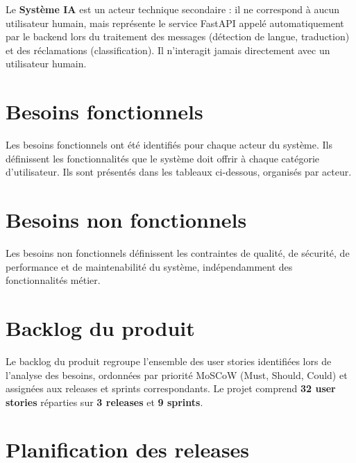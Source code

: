 

Le \textbf{Système IA} est un acteur technique secondaire : il ne correspond à aucun utilisateur humain, mais représente le service FastAPI appelé automatiquement par le backend lors du traitement des messages (détection de langue, traduction) et des réclamations (classification). Il n'interagit jamais directement avec un utilisateur humain.

\section{Besoins fonctionnels}
\label{sec:besoins_fonctionnels}

Les besoins fonctionnels ont été identifiés pour chaque acteur du système. Ils définissent les fonctionnalités que le système doit offrir à chaque catégorie d'utilisateur. Ils sont présentés dans les tableaux ci-dessous, organisés par acteur.



\section{Besoins non fonctionnels}
\label{sec:besoins_non_fonctionnels}

Les besoins non fonctionnels définissent les contraintes de qualité, de sécurité, de performance et de maintenabilité du système, indépendamment des fonctionnalités métier.



\section{Backlog du produit}
\label{sec:backlog}

Le backlog du produit regroupe l'ensemble des user stories identifiées lors de l'analyse des besoins, ordonnées par priorité MoSCoW (Must, Should, Could) et assignées aux releases et sprints correspondants. Le projet comprend \textbf{32 user stories} réparties sur \textbf{3 releases} et \textbf{9 sprints}.



\section{Planification des releases}
\label{sec:planification_releases}

